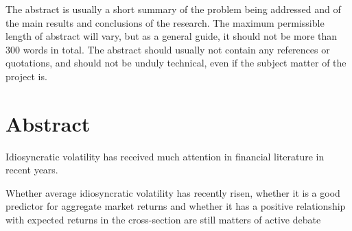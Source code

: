 The abstract is usually a short summary of the problem being addressed and of the main results and conclusions of the research. The maximum permissible length of abstract will vary, but as a general guide, it should not be more than 300 words in total. The abstract should usually not contain any references or quotations, and should not be unduly technical, even if the subject matter of the project is.

\chapter{Abstract}

Idiosyncratic volatility has received much attention in financial literature in recent years. 


Whether average idiosyncratic volatility has recently risen, whether it is a good predictor for
aggregate market returns and whether it has a positive relationship with expected returns in the
cross-section are still matters of active debate